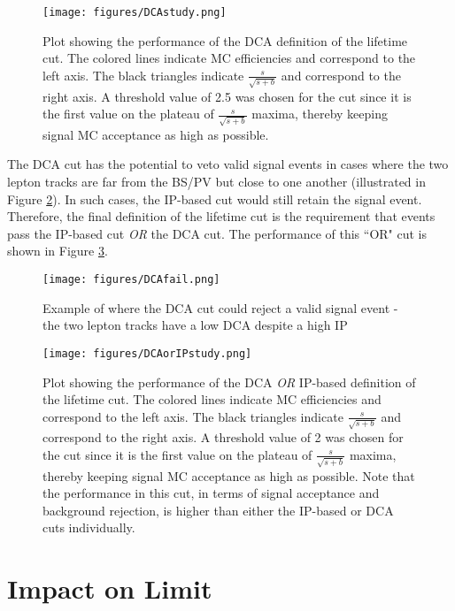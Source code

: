 \begin{figure}[tbh!]
\centering
\texttt{[image: figures/DCAstudy.png]}
\caption{Plot showing the performance of the DCA definition of the lifetime cut. The colored lines indicate MC efficiencies and correspond to the left axis. The black triangles indicate $\frac{s}{\sqrt{s+b}}$ and correspond to the right axis. A threshold value of 2.5 was chosen for the cut since it is the first value on the plateau of $\frac{s}{\sqrt{s+b}}$ maxima, thereby keeping signal MC acceptance as high as possible.}
\label{fig:DCAstudy}
\end{figure}

The DCA cut has the potential to veto valid signal events in cases where the two lepton tracks are far from the BS/PV but close to one another (illustrated in Figure \ref{fig:DCAfail}). In such cases, the IP-based cut would still retain the signal event. Therefore, the final definition of the lifetime cut is the requirement that events pass the IP-based cut \emph{OR} the DCA cut. The performance of this ``OR" cut is shown in Figure \ref{fig:DCAorIPstudy}.

\begin{figure}[tbh!]
\centering
\texttt{[image: figures/DCAfail.png]}
\caption{Example of where the DCA cut could reject a valid signal event - the two lepton tracks have a low DCA despite a high IP}
\label{fig:DCAfail}
\end{figure}

\begin{figure}[tbh!]
\centering
\texttt{[image: figures/DCAorIPstudy.png]}
\caption{Plot showing the performance of the DCA \emph{OR} IP-based definition of the lifetime cut. The colored lines indicate MC efficiencies and correspond to the left axis. The black triangles indicate $\frac{s}{\sqrt{s+b}}$ and correspond to the right axis. A threshold value of 2 was chosen for the cut since it is the first value on the plateau of $\frac{s}{\sqrt{s+b}}$ maxima, thereby keeping signal MC acceptance as high as possible. Note that the performance in this cut, in terms of signal acceptance and background rejection, is higher than either the IP-based or DCA cuts individually.}
\label{fig:DCAorIPstudy}
\end{figure}

\section{Impact on Limit}

